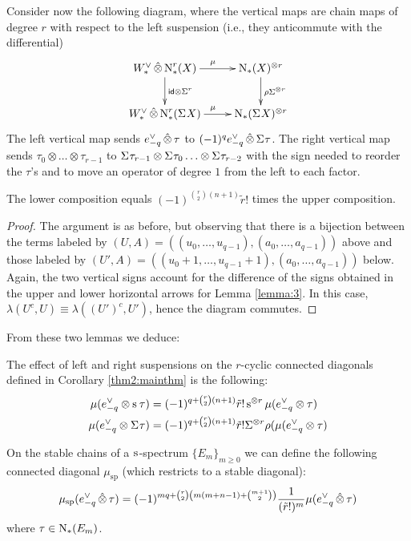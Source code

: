 Consider now the following diagram, where the vertical maps are chain maps of degree $r$ with respect to the left suspension (i.e., they anticommute with the differential)
\[
\xymatrix{
	\Wd\hotimes \rchains(X)\ar[r]^{\mu}\ar[d]^{\id\otimes \susp{r}} & \chains(X)^{\otimes r} \ar[d]^{\rho\susp{\otimes r}}
	\\
	\Wd\hotimes \rchains(\susp{} X)\ar[r]^{\mu} & \chains(\susp{}X)^{\otimes r}	
}
\]
The left vertical map sends $e_{-q}^\vee\operatorname{\hat{\otimes}} \tau$ to $(-1)^{q}e_{-q}^\vee\operatorname{\hat{\otimes}} \Sigma^{}\tau$. The right vertical map sends $\tau_0\otimes \ldots\otimes \tau_{r-1}$ to $\Sigma^{}\tau_{r-1}\otimes \Sigma^{}\tau_0\ldots\otimes \Sigma^{}\tau_{r-2}$ with the sign needed to reorder the $\tau$'s and to move an operator of degree $1$ from the left to each factor. 
\begin{lemma}
	The lower composition equals $(-1)^{\binom{r}{2}(n+1)}\tilde{r}!$ times the upper composition.
\end{lemma}
\begin{proof}
	The argument is as before, but observing that there is a bijection between the terms labeled by $(U,A) = ((u_0,\ldots,u_{q-1}),(a_0,\ldots,a_{q-1}))$ above and those labeled by $(U',A) = ((u_0+1,\ldots,u_{q-1}+1),(a_0,\ldots,a_{q-1}))$ below. Again, the two vertical signs account for the difference of the signs obtained in the upper and lower horizontal arrows for Lemma \ref{lemma:3}. In this case, $\lambda(U^c,U) \equiv \lambda((U')^c,U')$, hence the diagram commutes. 
\end{proof}
From these two lemmas we deduce:
\begin{proposition}\label{prop:suspensionconnected}
 The effect of left and right suspensions on the $r$-cyclic connected diagonals defined in Corollary \ref{thm2:mainthm} is the following:
 \begin{align*}
  \mu(e_{-q}^\vee \otimes \operatorname{s}^{}\tau) &= (-1)^{q + \binom{r}{2}(n+1)}\tilde{r}!\operatorname{s}^{\otimes r}\mu(e_{-q}^\vee \otimes \tau)
  \\
 \mu(e_{-q}^\vee \otimes \Sigma^{}\tau) &= (-1)^{q + \binom{r}{2}(n+1)}\tilde{r}!\Sigma^{\otimes r}\rho (\mu(e_{-q}^\vee \otimes \tau) 
 \end{align*}
\end{proposition}






\begin{corollary}
 On the stable chains of a $\operatorname{s}^{}$-spectrum $\{E_m\}_{m \geq 0}$ we can define the following connected diagonal $\mu_{\mathrm{sp}}$ (which restricts to a stable diagonal):
 \[
 \mu_{\mathrm{sp}}(e_{-q}^\vee \operatorname{\hat{\otimes}} \tau) = (-1)^{mq+\binom{r}{2}\left(m(m+n-1) + \binom{m+1}{2}\right)} \frac{1}{(\tilde{r}!)^m}\mu(e_{-q}^\vee \operatorname{\hat{\otimes}} \tau)
 \]
 where $\tau\in\operatorname{N}_{*}(E_m)$.
\end{corollary}

